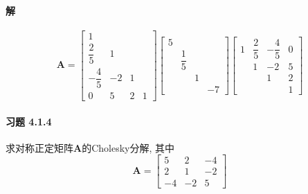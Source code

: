 \documentclass[12pt, a4paper, oneside, fontset=none]{ctexart}
\begin{document}
\paragraph*{解}
\[
    \bm{A} = \begin{bmatrix}
        1             &    &   &   \\
        \dfrac{2}{5}  & 1  &   &   \\
        -\dfrac{4}{5} & -2 & 1 &   \\
        0             & 5  & 2 & 1
    \end{bmatrix} \begin{bmatrix}
        5 &              &   &    \\
          & \dfrac{1}{5} &   &    \\
          &              & 1 &    \\
          &              &   & -7
    \end{bmatrix} \begin{bmatrix}
        1 & \dfrac{2}{5} & -\dfrac{4}{5} & 0 \\
          & 1            & -2            & 5 \\
          &              & 1             & 2 \\
          &              &               & 1
    \end{bmatrix}
\]

\paragraph*{习题 4.1.4} 求对称正定矩阵$\bm{A}$的Cholesky分解, 其中
\[
    \bm{A} = \begin{bmatrix}
        5  & 2  & -4 \\
        2  & 1  & -2 \\
        -4 & -2 & 5
    \end{bmatrix}
\]
\end{document}
